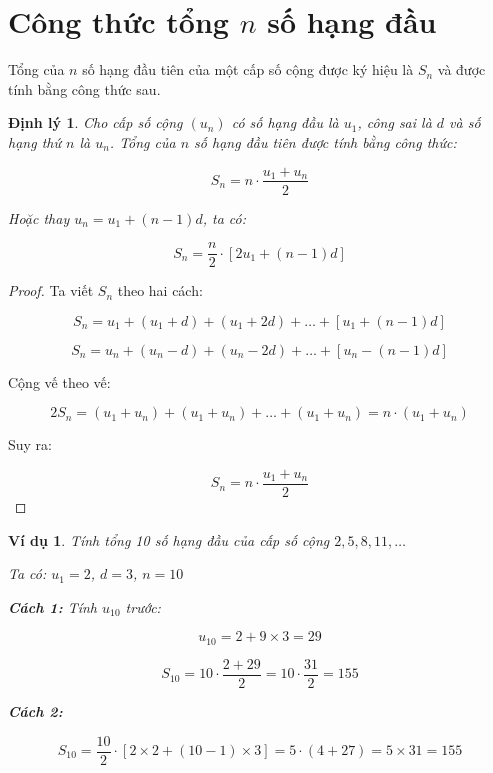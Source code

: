 \documentclass[12pt,a4paper]{report}
\newtheorem{theorem}{Định lý}[section]
\newtheorem{example}{Ví dụ}[section]
\begin{document}

\section{Công thức tổng \texorpdfstring{$n$}{n} số hạng đầu}

Tổng của $n$ số hạng đầu tiên của một cấp số cộng được ký hiệu là $S_n$ và được tính bằng công thức sau.

\begin{theorem}
    Cho cấp số cộng $(u_n)$ có số hạng đầu là $u_1$, công sai là $d$ và số hạng thứ $n$ là $u_n$. Tổng của $n$ số hạng đầu tiên được tính bằng công thức:
    
    \[
        S_n = n \cdot \frac{u_1 + u_n}{2}
    \]
    
    Hoặc thay $u_n = u_1 + (n - 1)d$, ta có:
    
    \[
        S_n = \frac{n}{2} \cdot [2u_1 + (n - 1)d]
    \]
\end{theorem}

\begin{proof}
    Ta viết $S_n$ theo hai cách:
    
    \[
        S_n = u_1 + (u_1 + d) + (u_1 + 2d)
        + \dots + [u_1 + (n - 1)d]
    \]
    
    \[
        S_n = u_n + (u_n - d) + (u_n - 2d)
        + \dots + [u_n - (n - 1)d]
    \]
    
    Cộng vế theo vế:
    
    \[
        2S_n = (u_1 + u_n) + (u_1 + u_n)
        + \dots + (u_1 + u_n)
        = n \cdot (u_1 + u_n)
    \]
    
    Suy ra:
    
    \[
        S_n = n \cdot \frac{u_1 + u_n}{2}
    \]
\end{proof}

\begin{example}
    Tính tổng 10 số hạng đầu của cấp số cộng $2, 5, 8, 11, \dots$
    
    Ta có: $u_1 = 2$, $d = 3$, $n = 10$
    
    \textbf{Cách 1:} Tính $u_{10}$ trước:
    
    \[
        u_{10} = 2 + 9 \times 3 = 29
    \]
    
    \[
        S_{10} = 10 \cdot \frac{2 + 29}{2}
        = 10 \cdot \frac{31}{2} = 155
    \]
    
    \textbf{Cách 2:}
    
    \[
        S_{10} = \frac{10}{2}
        \cdot [2 \times 2 + (10 - 1) \times 3]
        = 5 \cdot (4 + 27)
        = 5 \times 31 = 155
    \]
\end{example}
\end{document}
